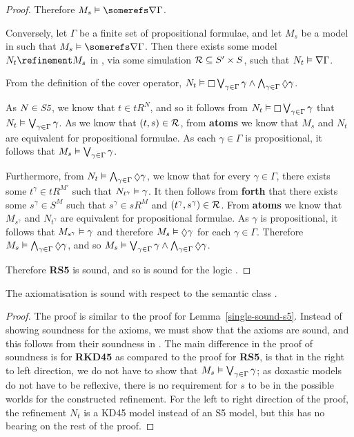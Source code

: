 \begin{proof}
Therefore $M_s \entails \somerefs \covers \Gamma$. 

Conversely, let $\Gamma$ be a finite set of propositional formulae, and let
$M_s$ be a model in \classS{} such that $M_s \entails \somerefs \covers \Gamma$.
Then there exists some model $N_t \refinement M_s$ in \classS, via some
simulation ${\cal R} \subseteq S' \times S$, such that $N_t \vDash \nabla
\Gamma$.

From the definition of the cover operator, $N_t \entails \knows
\bigvee_{\gamma \in \Gamma} \gamma \land \bigwedge_{\gamma \in \Gamma} \suspects
\gamma$. 

As $N \in \textit{S5}$, we know that $t \in tR^N$, and so it follows from
$N_t \entails \knows \bigvee_{\gamma \in \Gamma} \gamma$ that $N_t
\vDash \bigvee_{\gamma \in \Gamma} \gamma$. As we know that $(t, s) \in {\cal
R}$, from {\bf atoms} we know that $M_s$ and $N_t$ are equivalent for
propositional formulae. As each $\gamma \in \Gamma$ is propositional, it follows
that $M_s \vDash \bigvee_{\gamma \in \Gamma} \gamma$.

Furthermore, from $N_t \entails \bigwedge_{\gamma \in \Gamma} \suspects
\gamma$, we know that for every $\gamma \in \Gamma$, there exists some
$t^\gamma \in tR^{M'}$ such that $N_{t^\gamma} \vDash \gamma$. It then
follows from {\bf forth} that there exists some $s^\gamma \in S^M$ such that
$s^\gamma \in sR^M$ and $(t^\gamma, s^\gamma) \in {\cal R}$. From {\bf atoms}
we know that $M_{s^\gamma}$ and $N_{t^\gamma}$ are equivalent for
propositional formulae. As $\gamma$ is propositional, it follows that
$M_{s^\gamma} \vDash \gamma$ and therefore $M_s \entails \suspects \gamma$ for
each $\gamma \in \Gamma$.  Therefore $M_s \entails \bigwedge_{\gamma \in \Gamma}
\suspects \gamma$, and so $M_s \entails \bigvee_{\gamma \in \Gamma} \gamma \land
\bigwedge_{\gamma \in \Gamma} \suspects \gamma$.

Therefore {\bf RS5} is sound, and so \axiomSiF{} is sound for the logic
\logicSiF{}.
\end{proof}

\begin{lemma}\label{single-sound-kd45}
The axiomatisation \axiomKDiF{} is sound with respect to the semantic class
\classKDi{}.
\end{lemma}

\begin{proof}
The proof is similar to the proof for Lemma~\ref{single-sound-s5}. Instead of
showing soundness for the \axiomSi{} axioms, we must show that the \axiomKDi{}
axioms are sound, and this follows from their soundness in \logicKDi{}. The main
difference in the proof of soundness is for {\bf RKD45} as compared to the proof
for {\bf RS5}, is that in the right to left direction, we do not have to show
that $M_s \vDash \bigvee_{\gamma \in \Gamma} \gamma$; as doxastic models do
not have to be reflexive, there is no requirement for $s$ to be in the possible
worlds for the constructed refinement. For the left to right direction of the
proof, the refinement $N_t$ is a KD45 model instead of an S5 model, but this has
no bearing on the rest of the proof.
\end{proof}

